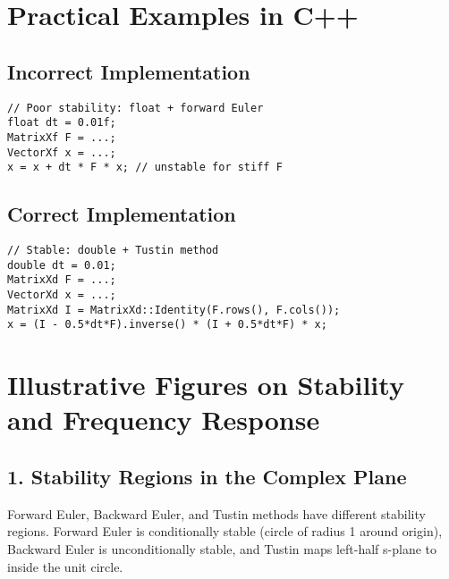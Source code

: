 \documentclass[11pt]{article}
\begin{document}
\section{Practical Examples in C++}
\subsection{Incorrect Implementation}
\begin{lstlisting}
// Poor stability: float + forward Euler
float dt = 0.01f;
MatrixXf F = ...;
VectorXf x = ...;
x = x + dt * F * x; // unstable for stiff F
\end{lstlisting}

\subsection{Correct Implementation}
\begin{lstlisting}
// Stable: double + Tustin method
double dt = 0.01;
MatrixXd F = ...;
VectorXd x = ...;
MatrixXd I = MatrixXd::Identity(F.rows(), F.cols());
x = (I - 0.5*dt*F).inverse() * (I + 0.5*dt*F) * x;
\end{lstlisting}

\section*{Illustrative Figures on Stability and Frequency Response}

\subsection*{1. Stability Regions in the Complex Plane}
Forward Euler, Backward Euler, and Tustin methods have different stability regions. Forward Euler is conditionally stable (circle of radius 1 around origin), Backward Euler is unconditionally stable, and Tustin maps left-half s-plane to inside the unit circle.

\begin{center}
\end{center}
\end{document}
